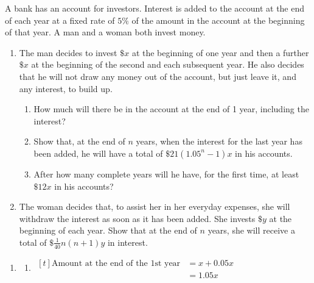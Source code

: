 \documentclass[11pt,a4paper]{book}
\begin{document}
\begin{example}

A bank has an account for investors. Interest is added to the account
at the end of each year at a fixed rate of $5\%$ of the amount in
the account at the beginning of that year. A man and a woman both
invest money. 

\begin{enumerate}[label=(\alph*)]

\item  The man decides to invest $\$x$ at the beginning of one year
and then a further $\$x$ at the beginning of the second and each
subsequent year. He also decides that he will not draw any money out
of the account, but just leave it, and any interest, to build up.

\begin{enumerate}[label=(\alph*)]

\item  How much will there be in the account at the end of 1 year,
including the interest?

\item  Show that, at the end of $n$ years, when the interest for
the last year has been added, he will have a total of $\$21\left(1.05^{n}-1\right)x$
in his accounts.

\item  After how many complete years will he have, for the first
time, at least $\$12x$ in his accounts?

\end{enumerate}

\item  The woman decides that, to assist her in her everyday expenses,
she will withdraw the interest as soon as it has been added. She invests $\$y$ at the beginning of each year. Show that at the end of $n$ years, she will receive a total of ${\displaystyle \$\frac{1}{40}n\left(n+1\right)y}$ in interest.

\end{enumerate}

\Solution

\begin{enumerate}[label=(\alph*)]

\item 

\begin{enumerate}[label=(\roman*)]

\item  
$
\begin{aligned}[t]
\text{Amount at the end of the 1st year} & =x+0.05x\\
 & =1.05x
\end{aligned}
$


\end{enumerate}
\end{enumerate}
\end{example}
\end{document}
